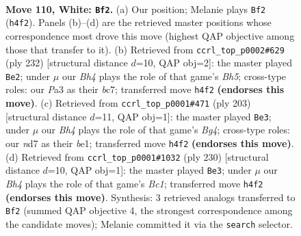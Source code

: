 \documentclass[11pt]{article}
\begin{document}
\clearpage

\begin{figure}[p]\centering
\begin{subfigure}{0.46\textwidth}\centering
\resizebox{\linewidth}{!}{%
\newchessgame
\chessboard[
  setfen={6k1/3n4/8/5P2/p6B/P6P/8/6K1 w - - 39 110},
  showmover=false,
  pgfstyle=straightmove, color=movearrow, markmove={h4-f2}
]}
\caption{}
\end{subfigure}\hfill
\begin{subfigure}{0.46\textwidth}\centering
\resizebox{\linewidth}{!}{%
\newchessgame
\chessboard[
  setfen={8/1Pb5/8/5k1B/7P/8/8/5K2 w - - 1 117},
  showmover=false,
  pgfstyle=straightmove, color=movearrow, markmove={h5-e2}
]}
\caption{}
\end{subfigure}
\\[4pt]
\begin{subfigure}{0.46\textwidth}\centering
\resizebox{\linewidth}{!}{%
\newchessgame
\chessboard[
  setfen={8/8/6p1/6b1/4k1p1/8/6K1/4B3 b - - 37 102},
  showmover=false,
  pgfstyle=straightmove, color=movearrow, markmove={g5-e3}
]}
\caption{}
\end{subfigure}\hfill
\begin{subfigure}{0.46\textwidth}\centering
\resizebox{\linewidth}{!}{%
\newchessgame
\chessboard[
  setfen={8/6k1/5p2/1n3P2/7P/5K2/8/2B5 w - - 35 116},
  showmover=false,
  pgfstyle=straightmove, color=movearrow, markmove={c1-e3}
]}
\caption{}
\end{subfigure}
\caption{\textbf{Move 110, White: \texttt{Bf2}.} (a) Our position; Melanie plays \texttt{Bf2} (\texttt{h4f2}). Panels (b)--(d) are the retrieved master positions whose correspondence most drove this move (highest QAP objective among those that transfer to it). (b) Retrieved from \texttt{ccrl\_top\_p0002\#629} (ply 232) [structural distance $d$=10, QAP obj=2]: the master played \texttt{Be2}; under $\mu$ our \emph{Bh4} plays the role of that game's \emph{Bh5}; cross-type roles: our \emph{P}a3 as their \emph{b}c7; transferred move \texttt{h4f2} \textbf{(endorses this move)}. (c) Retrieved from \texttt{ccrl\_top\_p0001\#471} (ply 203) [structural distance $d$=11, QAP obj=1]: the master played \texttt{Be3}; under $\mu$ our \emph{Bh4} plays the role of that game's \emph{Bg4}; cross-type roles: our \emph{n}d7 as their \emph{b}e1; transferred move \texttt{h4f2} \textbf{(endorses this move)}. (d) Retrieved from \texttt{ccrl\_top\_p0001\#1032} (ply 230) [structural distance $d$=10, QAP obj=1]: the master played \texttt{Be3}; under $\mu$ our \emph{Bh4} plays the role of that game's \emph{Bc1}; transferred move \texttt{h4f2} \textbf{(endorses this move)}. Synthesis: 3 retrieved analogs transferred to \texttt{Bf2} (summed QAP objective 4, the strongest correspondence among the candidate moves); Melanie committed it via the \texttt{search} selector.}
\label{fig:thought-m218}
\end{figure}
\end{document}
